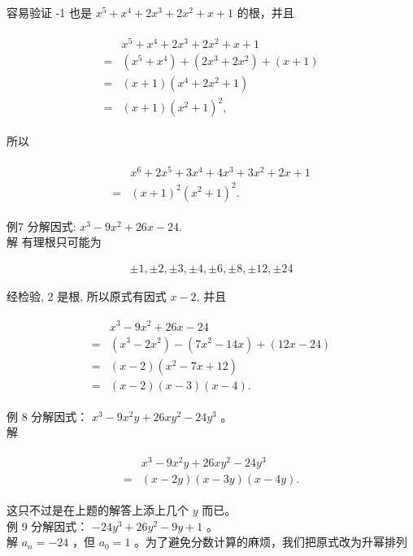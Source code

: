 \documentclass[10pt]{article}
\begin{document}
容易验证 -1 也是 $x^{5}+x^{4}+2 x^{3}+2 x^{2}+x+1$ 的根，并且

\begin{align*}
\begin{aligned}
& x^{5}+x^{4}+2 x^{3}+2 x^{2}+x+1 \\
= & \left(x^{5}+x^{4}\right)+\left(2 x^{3}+2 x^{2}\right)+(x+1) \\
= & (x+1)\left(x^{4}+2 x^{2}+1\right) \\
= & (x+1)\left(x^{2}+1\right)^{2},
\end{aligned}
\end{align*}

所以

\begin{align*}
\begin{aligned}
& x^{6}+2 x^{5}+3 x^{4}+4 x^{3}+3 x^{2}+2 x+1 \\
= & (x+1)^{2}\left(x^{2}+1\right)^{2} .
\end{aligned}
\end{align*}

例7 分解因式: $x^{3}-9 x^{2}+26 x-24$.\\
解 有理根只可能为

\begin{align*}
\pm 1, \pm 2, \pm 3, \pm 4, \pm 6, \pm 8, \pm 12, \pm 24
\end{align*}

经检验, 2 是根, 所以原式有因式 $x-2$, 并且

\begin{align*}
\begin{aligned}
& x^{3}-9 x^{2}+26 x-24 \\
= & \left(x^{3}-2 x^{2}\right)-\left(7 x^{2}-14 x\right)+(12 x-24) \\
= & (x-2)\left(x^{2}-7 x+12\right) \\
= & (x-2)(x-3)(x-4) .
\end{aligned}
\end{align*}

例 8 分解因式： $x^{3}-9 x^{2} y+26 x y^{2}-24 y^{3}$ 。\\
解

\begin{align*}
\begin{aligned}
& x^{3}-9 x^{2} y+26 x y^{2}-24 y^{3} \\
= & (x-2 y)(x-3 y)(x-4 y) .
\end{aligned}
\end{align*}

这只不过是在上题的解答上添上几个 $y$ 而已。\\
例 9 分解因式： $-24 y^{3}+26 y^{2}-9 y+1$ 。\\
解 $a_{n}=-24$ ，但 $a_{0}=1$ 。为了避免分数计算的麻烦，我们把原式改为升幂排列
\end{document}
